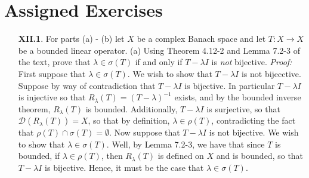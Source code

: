 \documentclass{article}
\begin{document}
\section*{Assigned Exercises}
\begin{itemize}
    \item[\textbf{XII.1}.] For parts (a) - (b) let $X$ be a complex Banach space and let $T: X \to X$ be a bounded linear operator. 
    \newline\newline
    (a) Using Theorem 4.12-2 and Lemma 7.2-3 of the text, prove that $\lambda \in \sigma(T)$ if and only if $T - \lambda I$ is \textit{not} bijective. 
    \newline\newline
    \textit{Proof:} First suppose that $\lambda \in \sigma(T)$. We wish to show that $T - \lambda I$ is not bijecctive. Suppose by way of contradiction that $T - \lambda I$ is bijective. In particular $T - \lambda I$ is injective so that $R_{\lambda}(T) = (T - \lambda)^{-1}$ exists, and by the bounded inverse theorem, $R_{\lambda}(T)$ is bounded. Additionally, $T - \lambda I$ is surjective, so that $\mathcal{D}(R_{\lambda}(T)) = X$, so that by definition, $\lambda \in \rho(T)$, contradicting the fact that $\rho(T) \cap \sigma(T) = \emptyset$.
    \newline\newline
    Now suppose that $T - \lambda I$ is not bijective. We wish to show that $\lambda \in \sigma(T)$. Well, by Lemma 7.2-3, we have that since $T$ is bounded, if $\lambda \in \rho(T)$, then $R_{\lambda}(T)$ is defined on $X$ and is bounded, so that $T - \lambda I$ is bijective. Hence, it must be the case that $\lambda \in \sigma(T)$.
    \newline\newline


\end{itemize}
\end{document}

